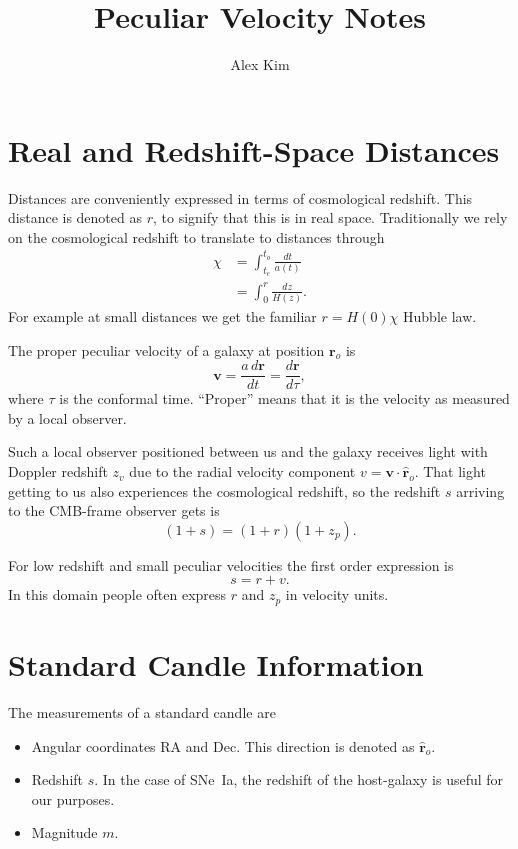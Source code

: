 \documentclass[11pt, oneside]{article}   	%
\title{Peculiar Velocity Notes}
\author{Alex Kim}
\begin{document}
\maketitle


\section{Real and Redshift-Space Distances}
Distances  are conveniently expressed
in terms of cosmological redshift.
This distance is denoted as $r$, to signify that this is in real space.
Traditionally we rely on the cosmological redshift to translate to distances
through
\begin{align}
\chi & = \int_{t_e}^{t_o} \frac{dt}{a(t)} \\
&= \int_{0}^{r} \frac{dz}{H(z)}.
\end{align}
For example at small distances we get the familiar $r=H(0) \chi$ Hubble law.

The proper peculiar velocity of a galaxy at position $\mathbf{r}_o$ is
\begin{equation}
\mathbf{v} = \frac{a\,d\mathbf{r}}{dt}= \frac{d\mathbf{r}}{d\tau},
\end{equation}
where $\tau$ is the conformal time.  ``Proper'' means that it is the velocity as
measured by a local observer.

Such a local observer positioned between us and the galaxy receives 
light with  Doppler redshift $z_v$ due to the radial
velocity component $v=\mathbf{v} \cdot  \mathbf{\hat{r}}_o$.
That light getting to us also experiences the cosmological redshift, so  the redshift $s$
arriving to the CMB-frame observer gets is 
\begin{equation}
(1+s)  = (1+r)(1+z_p).
\end{equation}

For low redshift and small peculiar velocities the first order expression is
\begin{equation}
s  = r +v.
\end{equation}
In this domain people often express $r$ and $z_p$ in velocity units.


\section{Standard Candle Information}
The measurements of a standard candle are
\begin{itemize}
\item Angular coordinates RA and Dec.  This direction is denoted as $\mathbf{\hat{r}}_o$.
\item Redshift $s$. In the case of SNe~Ia, the redshift of the host-galaxy is useful for our purposes.
\item Magnitude $m$.
\end{itemize}
\end{document}
